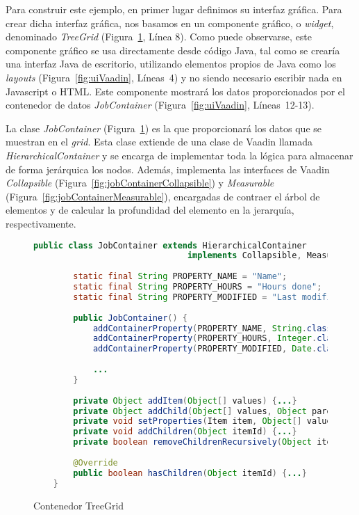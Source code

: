 Para construir este ejemplo, en primer lugar definimos su interfaz gráfica. Para crear dicha interfaz gráfica, nos basamos en un componente gráfico, o \emph{widget}, denominado \emph{TreeGrid}  (Figura~\ref{fig:jobContainer}, Línea 8). Como puede observarse, este componente gráfico se usa directamente desde código Java, tal como se crearía una interfaz Java de escritorio, utilizando elementos propios de Java como los \emph{layouts} (Figura~\ref{fig:uiVaadin}, Líneas~4) y no siendo necesario escribir nada en Javascript o HTML. Este componente mostrará los datos proporcionados por el contenedor de datos \emph{JobContainer} (Figura~\ref{fig:uiVaadin}, Líneas~12-13).

La clase \emph{JobContainer} (Figura~\ref{fig:jobContainer}) es la que proporcionará los datos que se muestran en el \emph{grid}. Esta clase extiende de una clase de Vaadin llamada \emph{HierarchicalContainer} y se encarga de implementar toda la lógica para almacenar de forma jerárquica los nodos. Además, implementa las interfaces de Vaadin \emph{Collapsible} (Figura~\ref{fig:jobContainerCollapsible}) y \emph{Measurable} (Figura~\ref{fig:jobContainerMeasurable}), encargadas de contraer el árbol de elementos y de calcular la profundidad del elemento en la jerarquía, respectivamente.

\begin{figure}[!tb]
	\centering
	\begin{lstlisting}[language=Java]
	public class JobContainer extends HierarchicalContainer 
                               implements Collapsible, Measurable {
	
		static final String PROPERTY_NAME = "Name";
		static final String PROPERTY_HOURS = "Hours done";
		static final String PROPERTY_MODIFIED = "Last modified";
		
		public JobContainer() {
			addContainerProperty(PROPERTY_NAME, String.class, "");
			addContainerProperty(PROPERTY_HOURS, Integer.class, 0);
			addContainerProperty(PROPERTY_MODIFIED, Date.class, new Date());
			
			...	
		}
		
		private Object addItem(Object[] values) {...}
		private Object addChild(Object[] values, Object parentId) {...}
		private void setProperties(Item item, Object[] values) {...}
		private void addChildren(Object itemId) {...}
		private boolean removeChildrenRecursively(Object itemId) {...}
		
		@Override
		public boolean hasChildren(Object itemId) {...}
	}
    \end{lstlisting}
	\caption{Contenedor TreeGrid}
	\label{fig:jobContainer}
\end{figure}


